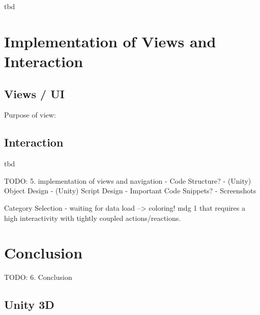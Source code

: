tbd




\section{Implementation of Views and Interaction}


\subsection{Views / UI}


Purpose of view:



\subsection{Interaction}

tbd


TODO:
5. implementation of views and navigation
- Code Structure?
- (Unity) Object Design
- (Unity) Script Design
- Important Code Snippets?
- Screenshots



Category Selection - waiting for data load --> coloring!
\gls{mdg} 1 that requires a high interactivity with tightly coupled actions/reactions.



\section{Conclusion}


TODO:
6. Conclusion


\subsection{Unity 3D}


